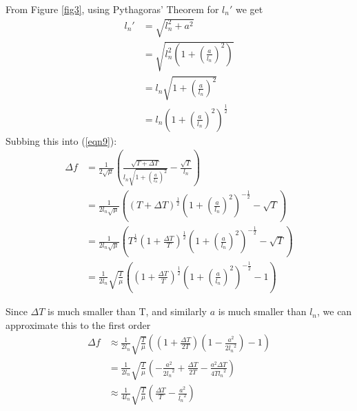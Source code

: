 \documentclass[11pt]{article}
\begin{document}
\begin{flushleft}
                From Figure \ref{fig3}, using Pythagoras' Theorem for $l_n'$ we get
                \begin{align}
                    l_n' &= \sqrt{l_n^2+a^2} \\
                    &= \sqrt{l_n^2\left(1+\left(\frac{a}{l_n}\right) ^2\right)} \\
                    &= l_n \sqrt{1+\left(\frac{a}{l_n}\right) ^2} \\
                    &= l_n \left(1+\left(\frac{a}{l_n}\right) ^2\right)^{\frac{1}{2}} 
                \end{align}
                Subbing this into (\ref{eqn9}):
                \begin{align}
                    \Delta f &= \frac{1}{2\sqrt{\mu}} \left( \frac{\sqrt{T+\Delta T}}{l_n\sqrt{1+\left(\frac{a}{l_n}\right) ^2}} - \frac{\sqrt{T}}{l_n} \right) \\
                    &= \frac{1}{2l_n\sqrt{\mu}} \left( (T+\Delta T)^{\frac{1}{2}} \left( 1+\left(\frac{a}{l_n}\right) ^2\right)^{-\frac{1}{2}} - \sqrt{T} \right) \\
                    &= \frac{1}{2l_n\sqrt{\mu}} \left( T^{\frac{1}{2}}\left(1+\frac{\Delta T}{T}\right)^{\frac{1}{2}} \left( 1+\left(\frac{a}{l_n}\right) ^2\right)^{-\frac{1}{2}} - \sqrt{T} \right) \\
                    &= \frac{1}{2l_n} \sqrt{\frac{T}{\mu}}\left(\left(1+\frac{\Delta T}{T}\right)^{\frac{1}{2}} \left( 1+\left(\frac{a}{l_n}\right) ^2\right)^{-\frac{1}{2}} - 1 \right)
                \end{align}

                Since $\Delta T$ is much smaller than T, and similarly $a$ is much smaller than $l_n$, we can approximate this to the first order
                \begin{align}
                    \Delta f &\approx \frac{1}{2l_n} \sqrt{\frac{T}{\mu}} \left( \left(1+\frac{\Delta T}{2T}\right) \left( 1- \frac{a^2}{2{l_n}^2} \right) - 1\right)\label{eqn18} \\ 
                    &= \frac{1}{2l_n} \sqrt{\frac{T}{\mu}} \left( -\frac{a^2}{2{l_n}^2} + \frac{\Delta T}{2T} - \frac{a^2\Delta T}{4T{l_n}^2}\right) \\
                    &\approx \frac{1}{4l_n} \sqrt{\frac{T}{\mu}} \left( \frac{\Delta T}{T} - \frac{a^2}{{l_n}^2} \right) \label{eqn20}
                \end{align}


\end{flushleft}
\end{document}
